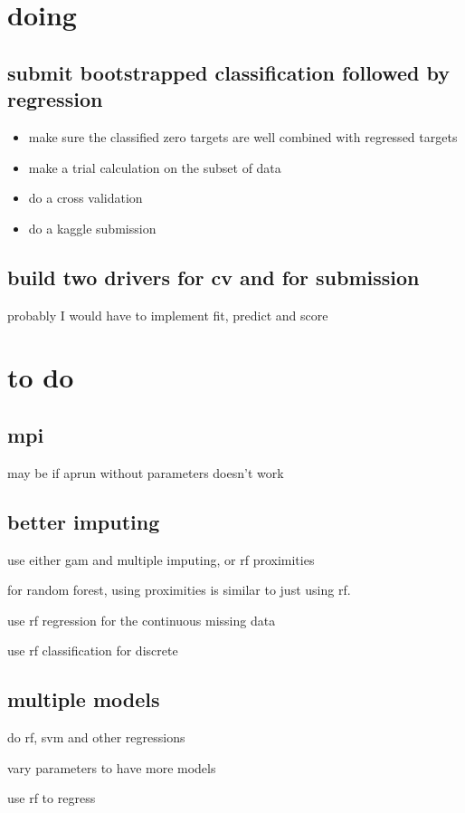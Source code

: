 \documentclass{article}
\let\Item\item
\renewcommand\item{\normalcolor\Item}
\begin{document}
\section{doing}
\subsection{submit bootstrapped classification followed by regression}


\begin{itemize}
  \item make sure the classified zero targets are well combined with regressed targets
  \item make a trial calculation on the subset of data
  \item do a cross validation
  \item do a kaggle submission
\end{itemize}


\subsection{build two drivers for cv and for submission}
probably I would have to implement fit, predict and score
\section{to do}
\subsection{mpi}
may be if aprun without parameters doesn't work
\subsection{better imputing}
use either gam and multiple imputing, or rf proximities

for random forest, using proximities is similar to just using rf.

use rf regression for the continuous missing data 

use rf classification for discrete 

\subsection{multiple models}

do rf, svm and other regressions

vary parameters to have more models

use rf to regress
\end{document}
